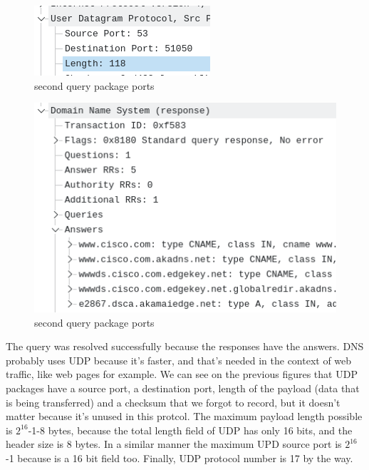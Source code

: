 \begin{figure}[htbp]
	\centering
	\includegraphics[width=1\linewidth]{img/11.png}
	\caption{second query package ports}\label{fig:11}
\end{figure}

\begin{figure}[htbp]
	\centering
	\includegraphics[width=1\linewidth]{img/12.png}
	\caption{second query package ports}\label{fig:12}
\end{figure}

The query was resolved successfully because the responses have the answers. DNS
probably uses UDP because it's faster, and that's needed in the context of web
traffic, like web pages for example. We can see on the previous figures that
UDP packages have a source port, a destination port, length of the payload
(data that is being transferred) and a checksum that we forgot to record, but it doesn't matter because it's unused in this protcol. The maximum payload length possible is \(2^{16}\)-1-8 bytes, because the total length field of UDP has only 16 bits, and the header size is 8 bytes. In a similar manner the maximum UPD source port is \(2^{16}\)-1 because is a 16 bit field too. Finally, UDP protocol number is 17 by the way.
